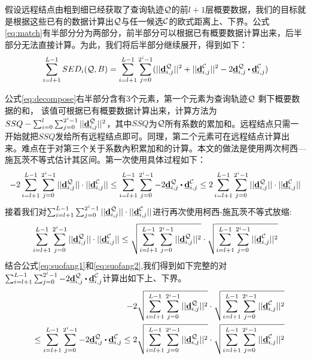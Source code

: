 假设远程结点由粗到细已经获取了查询轨迹$\cal Q$的前$l+1$层概要数据，我们的目标就是根据这些已有的数据计算出$\cal Q$与任一候选$\cal C$的欧式距离上、下界。公式 \ref{eq:match}有半部分分为两部分，前半部分可以根据已有概要数据计算出来，后半部分无法直接计算。为此，我们将后半部分继续展开，得到如下：
\begin{eqnarray}\label{eq:decompose}
\sum_{i=l+1}^{L-1}SED_{i}({\cal Q},B)= \sum_{i=l+1}^{L-1}\sum_{j=0}^{2^i-1}(||\vd_{i,j}^{\cal Q}||^2+||\vd_{i,j}^{\cal C}||^2 -
2  \vd_{i,j}^{\cal Q} \bigcdot \vd_{i,j}^{\cal C}) 
\end{eqnarray}

公式\ref{eq:decompose}右半部分含有3个元素，第一个元素为查询轨迹$\cal Q$ 剩下概要数据的和， 该值可根据已有概要数据计算出来，计算方法为$SSQ-\sum_{i=0}^{l}\sum_{j=0}^{2^i-1}||\emph{{\textbf{d}}}_{i,j}^{\cal Q}||^2$，其中$SSQ$为$\cal Q$所有系数的累加和。远程结点只需一开始就把$SSQ$发给所有远程结点即可。同理，第二个元素可在远程结点计算出来。难点在于对第三个关于系数內积累加和的计算。本文的做法是使用两次柯西—施瓦茨不等式估计其区间。第一次使用具体过程如下：
\begin{eqnarray}\label{eq:suofang1}
	-2\sum_{i=l+1}^{L-1}\sum_{j=0}^{2^i-1} ||\vd_{i,j}^{\cal Q}||\cdot ||\vd_{i,j}^{\cal C}||
	\le  \sum_{i=l+1}^{L-1}\sum_{j=0}^{2^i-1} -2\vd_{i,j}^{\cal Q}\bigcdot \vd_{i,j}^{\cal C} 
	\le  2\sum_{i=l+1}^{L-1}\sum_{j=0}^{2^i-1} ||\vd_{i,j}^{\cal Q}||\cdot ||\vd_{i,j}^{\cal C}||
\end{eqnarray}
接着我们对$\sum_{i=l+1}^{L-1}\sum_{j=0}^{2^i-1} ||\emph{{\textbf{d}}}_{i,j}^{\cal Q}||\cdot ||\emph{{\textbf{d}}}_{i,j}^{\cal C}||$进行再次使用柯西-施瓦茨不等式放缩:
\begin{eqnarray}\label{eq:suofang2}
\sum_{i=l+1}^{L-1}\sum_{j=0}^{2^i-1} ||\emph{{\textbf{d}}}_{i,j}^{\cal Q}||\cdot ||\emph{{\textbf{d}}}_{i,j}^{\cal C}|| \le 
	\sqrt{\sum_{i=l+1}^{L-1}\sum_{j=0}^{2^i-1}||\emph{{\textbf{d}}}_{i,j}^{\cal Q}||^2} \cdot \sqrt{\sum_{i=l+1}^{L-1}\sum_{j=0}^{2^i-1}||\emph{{\textbf{d}}}_{i,j}^{\cal C}||^2}
\end{eqnarray}
结合公式\ref{eq:suofang1}和\ref{eq:suofang2},我们得到如下完整的对$\sum_{i=l+1}^{L-1}\sum_{j=0}^{2^i-1} -2\vd_{i,j}^{\cal Q}\bigcdot \vd_{i,j}^{\cal C} $计算出如下上、下界。
 \begin{eqnarray}\label{eq:bound}
&&-2\sqrt{\sum_{i=l+1}^{L-1}\sum_{j=0}^{2^i-1}||\vd_{i,j}^{\cal Q}||^2} \cdot \sqrt{\sum_{i=l+1}^{L-1}\sum_{j=0}^{2^i-1}||\vd_{i,j}^{\cal C}||^2} \nonumber \\
&& 
\le  \sum_{i=l+1}^{L-1}\sum_{j=0}^{2^i-1} -2\vd_{i,j}^{\cal Q}\bigcdot \vd_{i,j}^{\cal C} 
\le  2\sqrt{\sum_{i=l+1}^{L-1}\sum_{j=0}^{2^i-1}||\vd_{i,j}^{\cal Q}||^2} \cdot \sqrt{\sum_{i=l+1}^{L-1}\sum_{j=0}^{2^i-1}||\vd_{i,j}^{\cal C}||^2}
\end{eqnarray}

